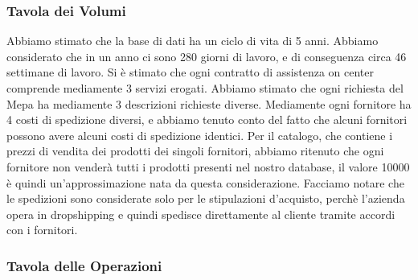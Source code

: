 

\subsubsection{Tavola dei Volumi}

\noindent{}
\newpage
\noindent{}

\noindent
Abbiamo stimato che la base di dati ha un ciclo di vita di 5 anni.
\newline
Abbiamo considerato che in un anno ci sono 280 giorni di lavoro, e di conseguenza circa 46 settimane di lavoro.
\newline
Si è stimato che ogni contratto di assistenza on center comprende mediamente 3 servizi erogati.
\newline
Abbiamo stimato che ogni richiesta del Mepa ha mediamente 3 descrizioni richieste diverse.
\newline
Mediamente ogni fornitore ha 4 costi di spedizione diversi, e abbiamo tenuto conto del fatto che alcuni fornitori possono avere alcuni costi di spedizione identici.
\newline
Per il catalogo, che contiene i prezzi di vendita dei prodotti dei singoli fornitori, abbiamo ritenuto che ogni fornitore non venderà tutti i prodotti presenti nel nostro database, il valore 10000 è quindi un'approssimazione nata da questa considerazione.
\newline
Facciamo notare che le spedizioni sono considerate solo per le stipulazioni d'acquisto, perchè l'azienda opera in dropshipping e quindi spedisce direttamente al cliente tramite accordi con i fornitori.

\subsubsection{Tavola delle Operazioni}

\noindent{}
\newpage
\noindent{}
\newpage
\noindent{}
